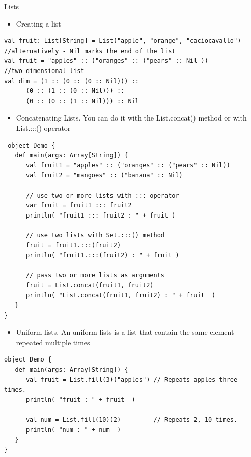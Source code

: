 \documentclass[presentation, aspectratio=169]{beamer}
\begin{document}
\begin{frame}{Lists}
 \begin{itemize}
\item Creating a list
\end{itemize}
\tiny
\begin{verbatim}
val fruit: List[String] = List("apple", "orange", "caciocavallo")
//alternatively - Nil marks the end of the list
val fruit = "apples" :: ("oranges" :: ("pears" :: Nil ))
//two dimensional list
val dim = (1 :: (0 :: (0 :: Nil))) ::
	  (0 :: (1 :: (0 :: Nil))) ::
	  (0 :: (0 :: (1 :: Nil))) :: Nil

\end{verbatim}
\large
\begin{itemize}
\item Concatenating Lists. You can do it with the List.concat() method or with List.:::() operator
\end{itemize}
\tiny
\begin{verbatim}
 object Demo {
   def main(args: Array[String]) {
      val fruit1 = "apples" :: ("oranges" :: ("pears" :: Nil))
      val fruit2 = "mangoes" :: ("banana" :: Nil)

      // use two or more lists with ::: operator
      var fruit = fruit1 ::: fruit2
      println( "fruit1 ::: fruit2 : " + fruit )

      // use two lists with Set.:::() method
      fruit = fruit1.:::(fruit2)
      println( "fruit1.:::(fruit2) : " + fruit )

      // pass two or more lists as arguments
      fruit = List.concat(fruit1, fruit2)
      println( "List.concat(fruit1, fruit2) : " + fruit  )
   }
}
\end{verbatim}
\large
\begin{itemize}
\item Uniform lists. An uniform lists is a list that contain the same element repeated multiple times
\end{itemize}
\tiny
\begin{verbatim}
object Demo {
   def main(args: Array[String]) {
      val fruit = List.fill(3)("apples") // Repeats apples three times.
      println( "fruit : " + fruit  )

      val num = List.fill(10)(2)         // Repeats 2, 10 times.
      println( "num : " + num  )
   }
}

\end{verbatim}
\end{frame}
\end{document}

